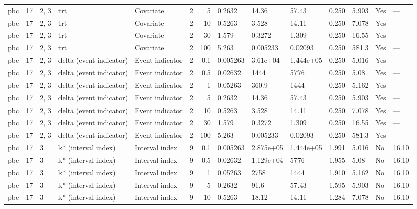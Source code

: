 \begin{tabular}{lrlllrrlllllll}
  pbc & 17 & 2, 3 & trt & Covariate & 2 &     5 & 0.2632 & 14.36 & 57.43 & 0.250 & 5.903 & Yes & --- \\ 
  pbc & 17 & 2, 3 & trt & Covariate & 2 &    10 & 0.5263 & 3.528 & 14.11 & 0.250 & 7.078 & Yes & --- \\ 
  pbc & 17 & 2, 3 & trt & Covariate & 2 &    30 & 1.579 & 0.3272 & 1.309 & 0.250 & 16.55 & Yes & --- \\ 
  pbc & 17 & 2, 3 & trt & Covariate & 2 &   100 & 5.263 & 0.005233 & 0.02093 & 0.250 & 581.3 & Yes & --- \\ 
  pbc & 17 & 2, 3 & delta (event indicator) & Event indicator & 2 &   0.1 & 0.005263 & 3.61e+04 & 1.444e+05 & 0.250 & 5.016 & Yes & --- \\ 
  pbc & 17 & 2, 3 & delta (event indicator) & Event indicator & 2 &   0.5 & 0.02632 & 1444 & 5776 & 0.250 & 5.08 & Yes & --- \\ 
  pbc & 17 & 2, 3 & delta (event indicator) & Event indicator & 2 &     1 & 0.05263 & 360.9 & 1444 & 0.250 & 5.162 & Yes & --- \\ 
  pbc & 17 & 2, 3 & delta (event indicator) & Event indicator & 2 &     5 & 0.2632 & 14.36 & 57.43 & 0.250 & 5.903 & Yes & --- \\ 
  pbc & 17 & 2, 3 & delta (event indicator) & Event indicator & 2 &    10 & 0.5263 & 3.528 & 14.11 & 0.250 & 7.078 & Yes & --- \\ 
  pbc & 17 & 2, 3 & delta (event indicator) & Event indicator & 2 &    30 & 1.579 & 0.3272 & 1.309 & 0.250 & 16.55 & Yes & --- \\ 
  pbc & 17 & 2, 3 & delta (event indicator) & Event indicator & 2 &   100 & 5.263 & 0.005233 & 0.02093 & 0.250 & 581.3 & Yes & --- \\ 
  pbc & 17 & 3 & k* (interval index) & Interval index & 9 &   0.1 & 0.005263 & 2.875e+05 & 1.444e+05 & 1.991 & 5.016 & No & 16.10 \\ 
  pbc & 17 & 3 & k* (interval index) & Interval index & 9 &   0.5 & 0.02632 & 1.129e+04 & 5776 & 1.955 & 5.08 & No & 16.10 \\ 
  pbc & 17 & 3 & k* (interval index) & Interval index & 9 &     1 & 0.05263 & 2758 & 1444 & 1.910 & 5.162 & No & 16.10 \\ 
  pbc & 17 & 3 & k* (interval index) & Interval index & 9 &     5 & 0.2632 & 91.6 & 57.43 & 1.595 & 5.903 & No & 16.10 \\ 
  pbc & 17 & 3 & k* (interval index) & Interval index & 9 &    10 & 0.5263 & 18.12 & 14.11 & 1.284 & 7.078 & No & 16.10 \\ 

\end{tabular}
